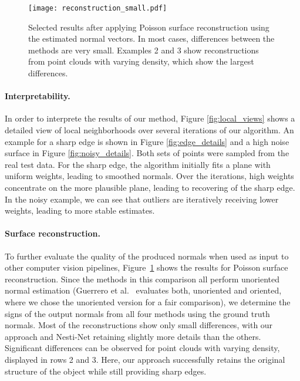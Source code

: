 \documentclass[10pt,twocolumn,letterpaper]{article}
\begin{document}
 \begin{figure}[h]
\centering
  \texttt{[image: reconstruction\_small.pdf]}
  \caption{Selected results after applying Poisson surface reconstruction using the estimated normal vectors. In most cases, differences between the methods are very small. Examples 2 and 3 show reconstructions from point clouds with varying density, which show the largest differences.}
  \label{fig:reconstruction}
\end{figure}


\paragraph{Interpretability.}
In order to interprete the results of our method, Figure \ref{fig:local_views} shows a detailed view of local neighborhoods over several iterations of our algorithm. An example for a sharp edge is shown in Figure \ref{fig:edge_details} and a high noise surface in Figure \ref{fig:noisy_details}. Both sets of points were sampled from the real test data. For the sharp edge, the algorithm initially fits a plane with uniform weights, leading to smoothed normals. Over the iterations, high weights concentrate on the more plausible plane, leading to recovering of the sharp edge. In the noisy example, we can see that outliers are iteratively receiving lower weights, leading to more stable estimates.



\paragraph{Surface reconstruction.}
To further evaluate the quality of the produced normals when used
as input to other computer vision pipelines, Figure~\ref{fig:reconstruction}
shows the results for Poisson surface reconstruction. Since the methods in this comparison all perform unoriented normal estimation (Guerrero et al.~\cite{Guerrero:2018} evaluates both, unoriented and oriented, where we chose the unoriented version for a fair comparison), we determine the signs of the output normals from all four methods using the ground truth normals. 
Most of the reconstructions show only small differences, with our
approach and Nesti-Net retaining slightly more details than the others.
Significant differences can be observed for point clouds with varying density,
displayed in rows 2 and 3. Here, our approach successfully retains the 
original structure of the object while still providing sharp edges.
\end{document}
